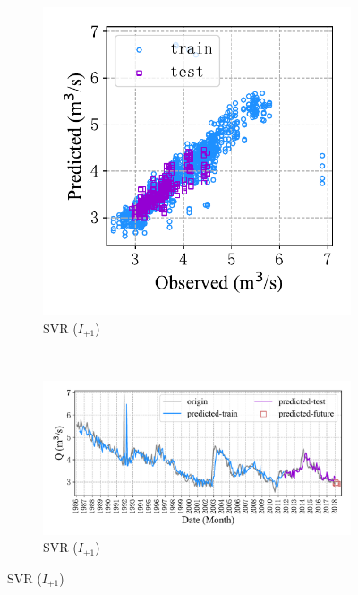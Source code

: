 \begin{figure}[!htbp]
  \centering
  \begin{subfigure}[b]{0.305\textwidth}
    \includegraphics[width=\textwidth]{Img/chap4_spr/out4/spr_scatter_in_1_out_4_svr.pdf}
    \vspace{-1.2cm}
    \caption{SVR ($I_{+1}$)}
    \label{fig:spr_scatter_in_1_out_4_svr}
  \end{subfigure}
  ~
  \begin{subfigure}[b]{0.615\textwidth}
    \includegraphics[width=\textwidth]{Img/chap4_spr/out4/spr_series_in_1_out_4_svr.pdf}
    \vspace{-1.2cm}
    \caption{SVR ($I_{+1}$)}
    \label{fig:spr_series_in_1_out_4_svr}

\end{subfigure}
\end{figure}
